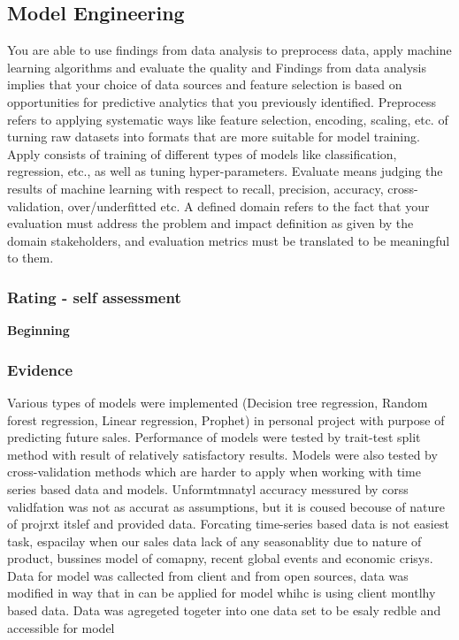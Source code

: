 \documentclass[a4paper, 11pt]{article}
\begin{document}
\subsection{Model Engineering}
You are able to use findings from data analysis to preprocess data, apply machine learning algorithms and evaluate the quality and 
\medbreak
Findings from data analysis implies that your choice of data sources and feature selection is based on opportunities for predictive analytics that you previously identified. Preprocess refers to applying systematic ways like feature selection, encoding, scaling, etc. of turning raw datasets into formats that are more suitable for model training. Apply consists of training of different types of models like classification, regression, etc., as well as tuning hyper-parameters. Evaluate means judging the results of machine learning with respect to recall, precision, accuracy, cross-validation, over/underfitted etc. A defined domain refers to the fact that your evaluation must address the problem and impact definition as given by the domain stakeholders, and evaluation metrics must be translated to be meaningful to them.

\subsubsection{Rating - self assessment}
\textbf{Beginning} 
\subsubsection{Evidence}
Various types of models were implemented (Decision tree regression, Random forest regression, Linear regression, Prophet) in personal project with purpose of predicting future sales. Performance of models were tested by trait-test split method with result of relatively satisfactory results. Models were also tested by cross-validation methods which are harder to apply when working with time series based data and models. Unformtmnatyl accuracy messured by corss validfation was not as accurat as assumptions, but it is coused becouse of nature of projrxt itslef and provided data. Forcating time-series based data is not easiest task, espacilay when our sales data lack of any seasonablity due to nature of product, bussines model of comapny, recent global events and economic crisys. Data for model was callected from client and from open sources, data was modified in way that in can be applied for model whihc is using client montlhy based data. Data was agregeted togeter into one data set to be esaly redble and accessible for model 
\end{document}
